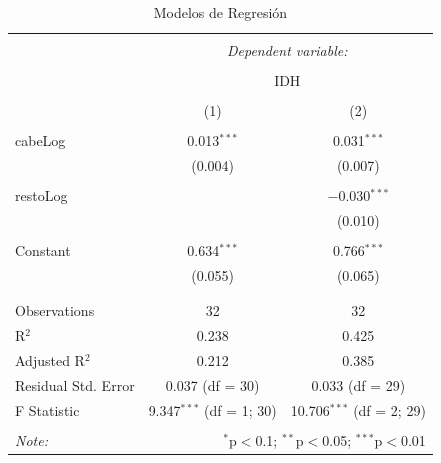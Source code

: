 \documentclass{article}
\begin{document}
\begin{table}[!htbp] \centering 
  \caption{Modelos de Regresión} 
  \label{regresiones} 
\begin{tabular}{@{\extracolsep{5pt}}lcc} 
\\[-1.8ex]\hline 
\hline \\[-1.8ex] 
 & \multicolumn{2}{c}{\textit{Dependent variable:}} \\ 
\cline{2-3} 
\\[-1.8ex] & \multicolumn{2}{c}{IDH} \\ 
\\[-1.8ex] & (1) & (2)\\ 
\hline \\[-1.8ex] 
 cabeLog & 0.013$^{***}$ & 0.031$^{***}$ \\ 
  & (0.004) & (0.007) \\ 
  & & \\ 
 restoLog &  & $-$0.030$^{***}$ \\ 
  &  & (0.010) \\ 
  & & \\ 
 Constant & 0.634$^{***}$ & 0.766$^{***}$ \\ 
  & (0.055) & (0.065) \\ 
  & & \\ 
\hline \\[-1.8ex] 
Observations & 32 & 32 \\ 
R$^{2}$ & 0.238 & 0.425 \\ 
Adjusted R$^{2}$ & 0.212 & 0.385 \\ 
Residual Std. Error & 0.037 (df = 30) & 0.033 (df = 29) \\ 
F Statistic & 9.347$^{***}$ (df = 1; 30) & 10.706$^{***}$ (df = 2; 29) \\ 
\hline 
\hline \\[-1.8ex] 
\textit{Note:}  & \multicolumn{2}{r}{$^{*}$p$<$0.1; $^{**}$p$<$0.05; $^{***}$p$<$0.01} \\ 
\end{tabular} 
\end{table} 













\renewcommand{\refname}{Bibliografia}

\end{document}
